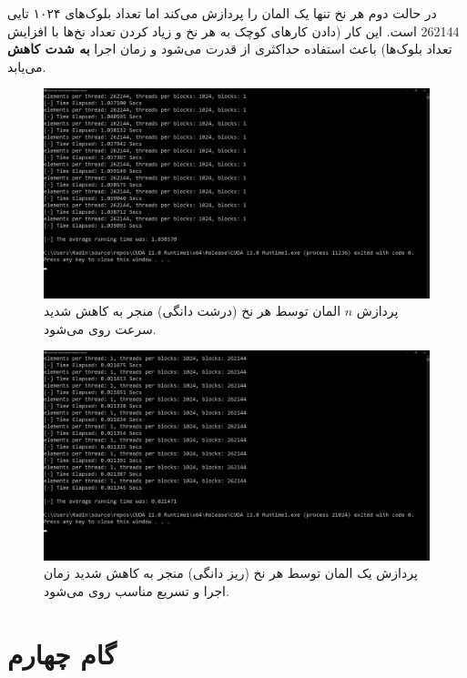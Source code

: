 \documentclass{HW}
\begin{document}
 در حالت دوم هر نخ تنها یک المان را پردازش می‌کند اما تعداد بلوک‌های ۱۰۲۴ تایی 262144 است. این کار (دادن کارهای کوچک به هر نخ و زیاد کردن تعداد نخ‌ها با افزایش تعداد بلوک‌ها) باعث استفاده حداکثری از قدرت  می‌شود و زمان اجرا \textbf{به شدت کاهش} می‌یابد.
 
\begin{figure}[ht!]
\begin{center}
	\includegraphics[width=15cm]{images/gpu-coarse}
\end{center}
\caption{پردازش
$n$
المان توسط هر نخ (درشت دانگی) منجر به کاهش شدید سرعت روی
می‌شود.}
\label{fig:gpu-coarse}
\end{figure}

\begin{figure}[ht!]
\begin{center}
	\includegraphics[width=15cm]{images/gpu-fine}
\end{center}
\caption{پردازش یک المان توسط هر نخ (ریز دانگی) منجر به کاهش شدید زمان اجرا و تسریع مناسب روی
می‌شود.}
\label{fig:gpu-fine}
\end{figure}


\newpage
\section{گام چهارم}
\end{document}
